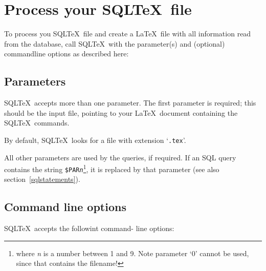 \documentclass{article}
\newcommand{\vs}{\vspace{3mm}}
\begin{document}
\section{Process your SQL\TeX\ file}

To process you SQL\TeX\ file and create a \LaTeX\ file with all information read from
the database, call SQL\TeX\ with the parameter(s) and (optional) command\-line options as
described here:

\subsection{Parameters}\label{params}

SQL\TeX\ accepts more than one parameter. The first parameter is required; this should
be the input file, pointing to your \LaTeX\ document containing the SQL\TeX\ commands.

By default, SQL\TeX\ looks for a file with extension `\texttt{.tex}'.

\vs

All other parameters are used by the queries, if required. If an SQL query contains the
string \texttt{\$PAR\textit{n}}\footnote{where \textit{n} is a number between 1 and 9. Note 
parameter `0' cannot be used, since that contains the filename!}, it is replaced by that parameter
(see also section~\ref{sqlstatements}).

\subsection{Command line options}\label{cmdline}

SQL\TeX\ accepts the followint command- line options:
\end{document}
